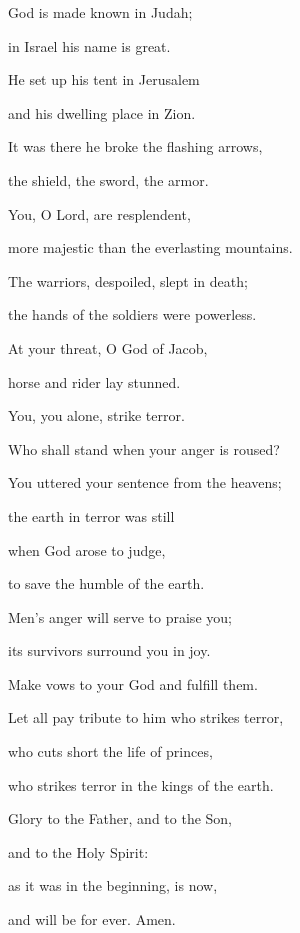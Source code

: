 \noindent God is made known in Judah;~\GreStar{}~\nopagebreak

in Israel his name is great.

\noindent He set up his tent in Jerusalem~\GreStar{}~\nopagebreak

and his dwelling place in Zion.

\noindent It was there he broke the flashing arrows,~\GreStar{}~\nopagebreak

the shield, the sword, the armor.

\noindent You, O Lord, are resplendent,~\GreStar{}~\nopagebreak

more majestic than the everlasting mountains.

\noindent The warriors, despoiled, slept in death;~\GreStar{}~\nopagebreak

the hands of the soldiers were powerless.

\noindent At your threat, O God of Jacob,~\GreStar{}~\nopagebreak

horse and rider lay stunned.

\noindent You, you alone, strike terror.~\GreStar{}~\nopagebreak

Who shall stand when your anger is roused?

\noindent You uttered your sentence from the heavens;~\GreStar{}~\nopagebreak

the earth in terror was still

\noindent when God arose to judge,~\GreStar{}~\nopagebreak

to save the humble of the earth.

\noindent Men’s anger will serve to praise you;~\GreStar{}~\nopagebreak

its survivors surround you in joy.

\noindent Make vows to your God and fulfill them.~\GreStar{}~\nopagebreak

Let all pay tribute to him who strikes terror,

\noindent who cuts short the life of princes,~\GreStar{}~\nopagebreak

who strikes terror in the kings of the earth.

\noindent Glory to the Father, and to the Son,~\GreStar{}~\nopagebreak

and to the Holy Spirit:

\noindent as it was in the beginning, is now,~\GreStar{}~\nopagebreak

and will be for ever. Amen.
